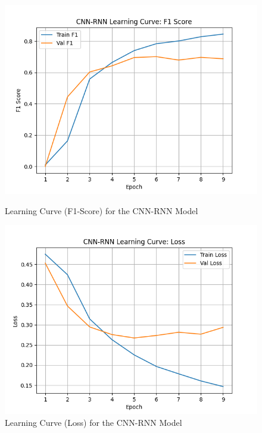 \begin{figure}[H]
\centering
\begin{minipage}[b]{0.48\textwidth}
    \centering
    \includegraphics[width=\textwidth]{images/Supervised_Results/cnn-rnn_learning_curve_f1.png}
    \caption{Learning Curve (F1-Score) for the CNN-RNN Model}
    \label{fig:cnn-rnn-learning-curve-f1}
\end{minipage}
\hfill
\begin{minipage}[b]{0.48\textwidth}
    \centering
    \includegraphics[width=\textwidth]{images/Supervised_Results/cnn-rnn_learning_curve_loss.png}
    \caption{Learning Curve (Loss) for the CNN-RNN Model}
    \label{fig:cnn-rnn-learning-curve-loss}
\end{minipage}
\end{figure}

